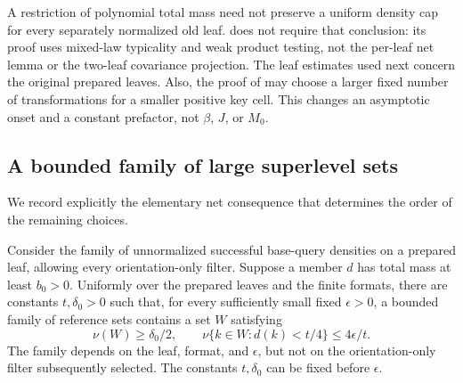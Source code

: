\begin{remark}
\label{rem:rare-restriction-caps}
A restriction of polynomial total mass need not preserve a uniform
density cap for every separately normalized old leaf.
 does not require that conclusion:
its proof uses mixed-law typicality and weak product testing, not
the per-leaf net lemma or the two-leaf covariance projection.
The leaf estimates used next concern the original prepared leaves.
Also, the proof of  may choose a larger
fixed number of transformations for a smaller positive key cell.
This changes an asymptotic onset and a constant prefactor, not
\(\beta\), \(J\), or \(M_0\).
\end{remark}

\subsection{A bounded family of large superlevel sets}

We record explicitly the elementary net consequence that determines
the order of the remaining choices.

\begin{lemma}
\label{lem:rare-superlevel-nets}
Consider the family of unnormalized successful base-query densities
on a prepared leaf, allowing every orientation-only filter.
Suppose a member \(d\) has total mass at least \(b_0>0\).
Uniformly over the prepared leaves and the finite formats,
there are constants \(t,\delta_0>0\) such that, for every sufficiently
small fixed \(\epsilon>0\), a bounded family of reference sets contains
a set \(W\) satisfying
\begin{equation}
 \nu(W)\ge\delta_0/2,\qquad
 \nu\{k\in W:d(k)<t/4\}\le4\epsilon/t.
 \label{eq:rare-net-superlevel}
\end{equation}
The family depends on the leaf, format, and \(\epsilon\), but not on
the orientation-only filter subsequently selected.
The constants \(t,\delta_0\) can be fixed before \(\epsilon\).
\end{lemma}

